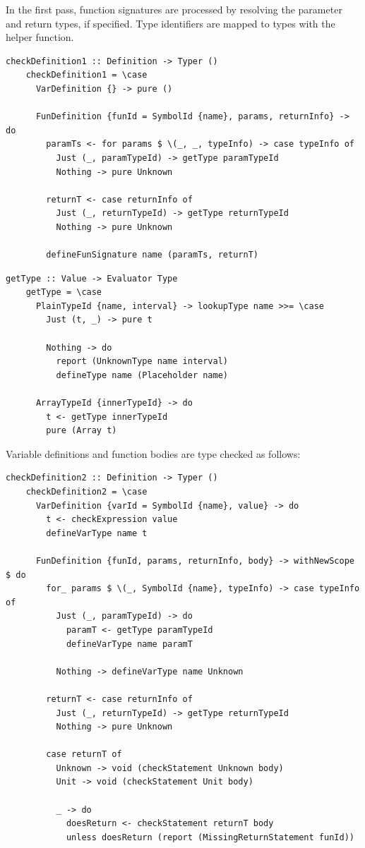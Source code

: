 \documentclass[UdineBachThesis,american,11pt,draft]{PhdThesis}
\begin{document}
  In the first pass, function signatures are processed by resolving the
  parameter and return types, if specified. Type identifiers are mapped to types
  with the \lstinline@getType@ helper function.

  \begin{lstlisting}[gobble=4,basicstyle=\ttfamily\small]
    checkDefinition1 :: Definition -> Typer ()
    checkDefinition1 = \case
      VarDefinition {} -> pure ()

      FunDefinition {funId = SymbolId {name}, params, returnInfo} -> do
        paramTs <- for params $ \(_, _, typeInfo) -> case typeInfo of
          Just (_, paramTypeId) -> getType paramTypeId
          Nothing -> pure Unknown

        returnT <- case returnInfo of
          Just (_, returnTypeId) -> getType returnTypeId
          Nothing -> pure Unknown

        defineFunSignature name (paramTs, returnT)
  \end{lstlisting}

  \begin{lstlisting}[gobble=4,basicstyle=\ttfamily\small]
    getType :: Value -> Evaluator Type
    getType = \case
      PlainTypeId {name, interval} -> lookupType name >>= \case
        Just (t, _) -> pure t

        Nothing -> do
          report (UnknownType name interval)
          defineType name (Placeholder name)

      ArrayTypeId {innerTypeId} -> do
        t <- getType innerTypeId
        pure (Array t)
  \end{lstlisting}

  Variable definitions and function bodies are type checked as follows:

  \begin{lstlisting}[gobble=4,basicstyle=\ttfamily\small]
    checkDefinition2 :: Definition -> Typer ()
    checkDefinition2 = \case
      VarDefinition {varId = SymbolId {name}, value} -> do
        t <- checkExpression value
        defineVarType name t

      FunDefinition {funId, params, returnInfo, body} -> withNewScope $ do
        for_ params $ \(_, SymbolId {name}, typeInfo) -> case typeInfo of
          Just (_, paramTypeId) -> do
            paramT <- getType paramTypeId
            defineVarType name paramT

          Nothing -> defineVarType name Unknown

        returnT <- case returnInfo of
          Just (_, returnTypeId) -> getType returnTypeId
          Nothing -> pure Unknown

        case returnT of
          Unknown -> void (checkStatement Unknown body)
          Unit -> void (checkStatement Unit body)

          _ -> do
            doesReturn <- checkStatement returnT body
            unless doesReturn (report (MissingReturnStatement funId))
  \end{lstlisting}
\end{document}
